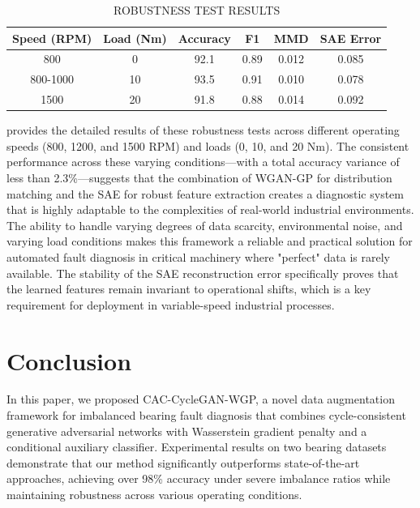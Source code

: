 \documentclass[conference,twocolumn]{IEEEtran}
\begin{document}
\begin{table}[htbp]
\centering
\caption{ROBUSTNESS TEST RESULTS}
\label{tab:robustness}
\begin{tabular}{cccccc}
\toprule
Speed (RPM) & Load (Nm) & Accuracy & F1 & MMD & SAE Error \\
\toprule
800 & 0 & 92.1 & 0.89 & 0.012 & 0.085 \\
800-1000 & 10 & 93.5 & 0.91 & 0.010 & 0.078 \\
1500 & 20 & 91.8 & 0.88 & 0.014 & 0.092 \\
\toprule
\end{tabular}
\end{table} provides the detailed results of these robustness tests across different operating speeds (800, 1200, and 1500 RPM) and loads (0, 10, and 20 Nm). The consistent performance across these varying conditions—with a total accuracy variance of less than 2.3\%—suggests that the combination of WGAN-GP for distribution matching and the SAE for robust feature extraction creates a diagnostic system that is highly adaptable to the complexities of real-world industrial environments. The ability to handle varying degrees of data scarcity, environmental noise, and varying load conditions makes this framework a reliable and practical solution for automated fault diagnosis in critical machinery where "perfect" data is rarely available. The stability of the SAE reconstruction error specifically proves that the learned features remain invariant to operational shifts, which is a key requirement for deployment in variable-speed industrial processes.


\section{Conclusion}
\label{sec:conclusion}

In this paper, we proposed CAC-CycleGAN-WGP, a novel data augmentation framework for imbalanced bearing fault diagnosis that combines cycle-consistent generative adversarial networks with Wasserstein gradient penalty and a conditional auxiliary classifier. Experimental results on two bearing datasets demonstrate that our method significantly outperforms state-of-the-art approaches, achieving over 98\% accuracy under severe imbalance ratios while maintaining robustness across various operating conditions.
\end{document}
